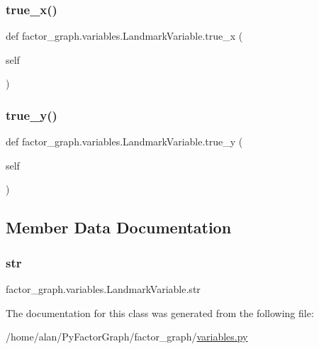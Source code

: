 \subsubsection{\texorpdfstring{true\+\_\+x()}{true\_x()}}
{\footnotesize\ttfamily def factor\+\_\+graph.\+variables.\+Landmark\+Variable.\+true\+\_\+x (\begin{DoxyParamCaption}\item[{}]{self }\end{DoxyParamCaption})}

\mbox{\label{classfactor__graph_1_1variables_1_1LandmarkVariable_ab7b92a5f21b170bad1596221c0d4963b}}
\subsubsection{\texorpdfstring{true\+\_\+y()}{true\_y()}}
{\footnotesize\ttfamily def factor\+\_\+graph.\+variables.\+Landmark\+Variable.\+true\+\_\+y (\begin{DoxyParamCaption}\item[{}]{self }\end{DoxyParamCaption})}



\subsection{Member Data Documentation}
\mbox{\label{classfactor__graph_1_1variables_1_1LandmarkVariable_a982a1d08012cc054cb9fe08e7f6f7907}}
\subsubsection{\texorpdfstring{str}{str}}
{\footnotesize\ttfamily factor\+\_\+graph.\+variables.\+Landmark\+Variable.\+str\hspace{0.3cm}{\ttfamily [static]}}



The documentation for this class was generated from the following file\+:\begin{DoxyCompactItemize}
\item
/home/alan/\+Py\+Factor\+Graph/factor\+\_\+graph/\hyperlink{variables_8py}{variables.\+py}\end{DoxyCompactItemize}
